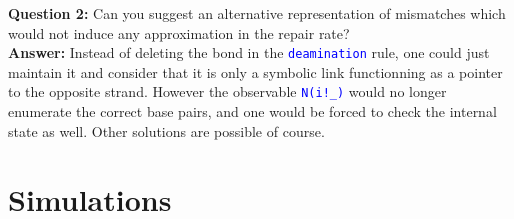 \documentclass[11pt]{article}
\def\ttt#1{\texttt{\textcolor{blue}{#1}}}
\def\lab#1{\hbox{\ttt{\color{Plum}\textquotesingle #1\textquotesingle}}}
\begin{document}
\vskip 0.25cm
\noindent\textbf{Question 2:} Can you suggest an alternative representation of mismatches which would not induce any approximation in the repair rate?
\\\textbf{Answer:} Instead of deleting the bond in the \lab{deamination} rule, one could just maintain it and consider that it is only a symbolic link functionning as a pointer to the opposite strand. However the observable \ttt{N(i!\_)} would no longer enumerate the correct base pairs, and one would be forced to check the internal state as well. Other solutions are possible of course.

\section{Simulations}



\end{document}

